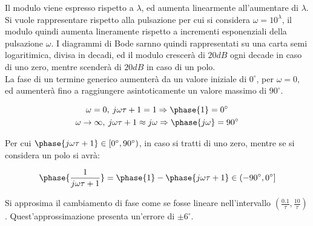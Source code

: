 \documentclass{article}
\numberwithin{equation}{subsection}
\begin{document}
\begin{center}
\end{center}

Il modulo viene espresso rispetto a $\lambda$, ed aumenta linearmente all'aumentare di $\lambda$. Si vuole rappresentare rispetto alla pulsazione per cui si considera 
$\omega=10^{\lambda}$, il modulo quindi aumenta lineramente rispetto a incrementi esponenziali della pulsazione $\omega$. I diagrammi di Bode sarnno quindi rappresentati 
su una carta semi logaritimica, divisa in decadi, ed il modulo crescerà di $20dB$ ogni decade in caso di uno zero, mentre scenderà di $20dB$ in caso di un polo. \\

La fase di un termine generico aumenterà da un valore iniziale di $0^{\circ}$, per $\omega=0$, ed aumenterà fino a raggiungere asintoticamente un valore massimo di 
$90^{\circ}$. 

\begin{gather}
    \omega=0,\: j\omega\tau+1=1\Rightarrow\phase{1}=0^{\circ}\\
    \omega\to\infty,\:j\omega\tau+1\approx j\omega\Rightarrow\phase{j\omega}=90^{\circ}
\end{gather}

Per cui $\phase{j\omega\tau+1}\in[0^{\circ},90^{\circ})$, in caso si tratti di uno zero, mentre se si considera un polo si avrà: 

\begin{equation}
    \phase{\displaystyle\frac{1}{j\omega\tau+1}}=\phase{1}-\phase{j\omega\tau+1}\in(-90^{\circ},0^{\circ}]
\end{equation}

Si approsima il cambiamento di fase come se fosse lineare nell'intervallo $\left(\displaystyle\frac{0.1}{\tau},\frac{10}{\tau}\right)$. 
Quest'approssimazione presenta un'errore di $\pm6^{\circ}$. 
\end{document}
